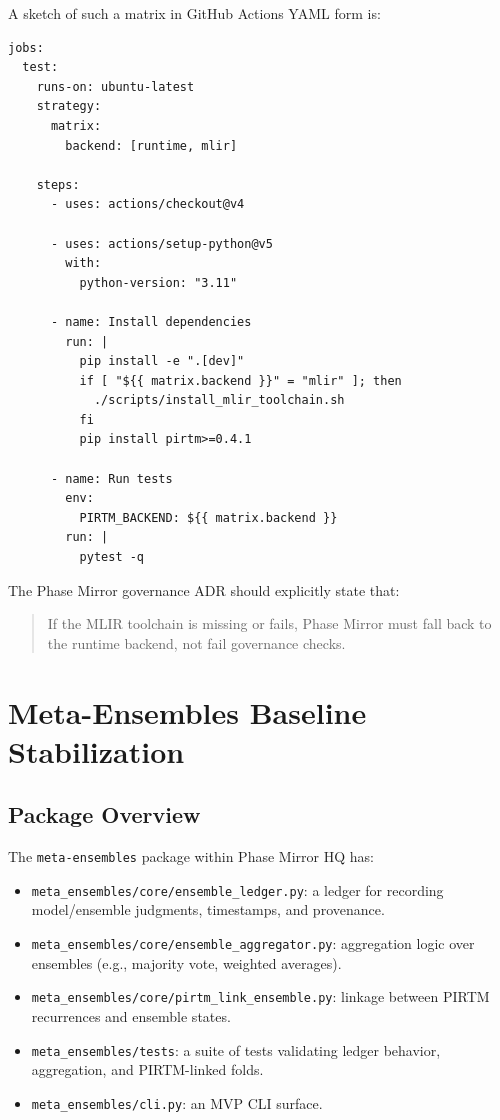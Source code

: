 \documentclass[11pt]{article}
\begin{document}
\noindent A sketch of such a matrix in GitHub Actions YAML form is:

\begin{lstlisting}[style=code]
jobs:
  test:
    runs-on: ubuntu-latest
    strategy:
      matrix:
        backend: [runtime, mlir]

    steps:
      - uses: actions/checkout@v4

      - uses: actions/setup-python@v5
        with:
          python-version: "3.11"

      - name: Install dependencies
        run: |
          pip install -e ".[dev]"
          if [ "${{ matrix.backend }}" = "mlir" ]; then
            ./scripts/install_mlir_toolchain.sh
          fi
          pip install pirtm>=0.4.1

      - name: Run tests
        env:
          PIRTM_BACKEND: ${{ matrix.backend }}
        run: |
          pytest -q
\end{lstlisting}

The Phase Mirror governance ADR should explicitly state that:
\begin{quote}
  If the MLIR toolchain is missing or fails, Phase Mirror must fall back to the runtime backend, not fail governance checks.
\end{quote}

\section{Meta-Ensembles Baseline Stabilization}

\subsection{Package Overview}

The \texttt{meta-ensembles} package within Phase Mirror HQ has:
\begin{itemize}
  \item \texttt{meta\_ensembles/core/ensemble\_ledger.py}: a ledger for recording model/ensemble judgments, timestamps, and provenance.
  \item \texttt{meta\_ensembles/core/ensemble\_aggregator.py}: aggregation logic over ensembles (e.g., majority vote, weighted averages).
  \item \texttt{meta\_ensembles/core/pirtm\_link\_ensemble.py}: linkage between PIRTM recurrences and ensemble states.
  \item \texttt{meta\_ensembles/tests}: a suite of tests validating ledger behavior, aggregation, and PIRTM-linked folds.
  \item \texttt{meta\_ensembles/cli.py}: an MVP CLI surface.
\end{itemize}
\end{document}
